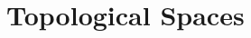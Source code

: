 \tableofcontents



\chapter{Topological Spaces}

























































%